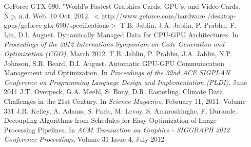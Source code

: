 \documentclass[a4paper,12pt]{article}
\begin{document}
\begin{thebibliography}{9}
\footnotesize
\vspace{-2ex}
 GeForce GTX 690. "World's Fastest Graphics Cards, GPU's, and Video Cards. N.p, n.d. Web. 10 Oct. 2012.
 $<$http://www.geforce.com/hardware /desktop-gpus/geforce-gtx-690/specifications$>$
\vspace{-2ex}
 T.B. Jablin, J.A. Jablin, P. Prabhu, F. Liu, D.I. August. Dynamically Managed Data for CPU-GPU Architectures. In \textit{Proceedings of the 2012 Internations Symposium on Code Generation and Optimization (CGO)}, March 2012.
\vspace{-2ex}
T.B. Jablin, P. Prabhu, J.A. Jablin, N.P. Johnson, S.R. Beard, D.I. August. Automatic GPU-GPU Communication Management and Optimization. In \textit{Proceedings of the 32nd ACE SIGPLAN Conference on Programming Language Design and Implementation (PLDI)}, June 2011
\vspace{-2ex}
 J.T. Overpeck, G.A. Meehl, S. Bony, D.R. Easterling.  Climate Data Challenges in the 21st Century.  In \textit{Science Magazine}, February 11, 2011.  Volume 331
\vspace{-2ex}
 J.R. Kelley, A. Adams, S. Paris, M. Levoy, S. Amarashinghe, F. Durande.  Decoupling Algorithms from Schedules for Easy Optimization of Image Processing Pipelines.  In \textit{ACM Transaction on Graphics - SIGGRAPH 2012 Conference Proceedings}, Volume 31 Issue 4, July 2012
\end{thebibliography}
\end{document}
